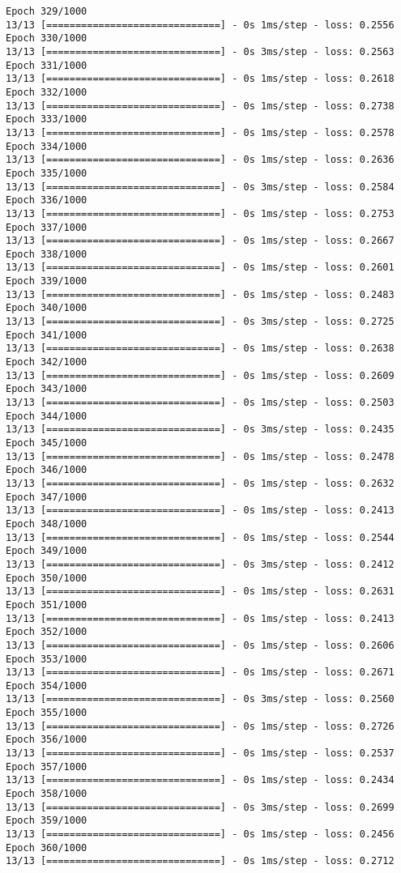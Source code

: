 \documentclass[11pt]{article}
\begin{document}
\begin{Verbatim}[commandchars=\\\{\}]
Epoch 329/1000
13/13 [==============================] - 0s 1ms/step - loss: 0.2556
Epoch 330/1000
13/13 [==============================] - 0s 3ms/step - loss: 0.2563
Epoch 331/1000
13/13 [==============================] - 0s 1ms/step - loss: 0.2618
Epoch 332/1000
13/13 [==============================] - 0s 1ms/step - loss: 0.2738
Epoch 333/1000
13/13 [==============================] - 0s 1ms/step - loss: 0.2578
Epoch 334/1000
13/13 [==============================] - 0s 1ms/step - loss: 0.2636
Epoch 335/1000
13/13 [==============================] - 0s 3ms/step - loss: 0.2584
Epoch 336/1000
13/13 [==============================] - 0s 1ms/step - loss: 0.2753
Epoch 337/1000
13/13 [==============================] - 0s 1ms/step - loss: 0.2667
Epoch 338/1000
13/13 [==============================] - 0s 1ms/step - loss: 0.2601
Epoch 339/1000
13/13 [==============================] - 0s 1ms/step - loss: 0.2483
Epoch 340/1000
13/13 [==============================] - 0s 3ms/step - loss: 0.2725
Epoch 341/1000
13/13 [==============================] - 0s 1ms/step - loss: 0.2638
Epoch 342/1000
13/13 [==============================] - 0s 1ms/step - loss: 0.2609
Epoch 343/1000
13/13 [==============================] - 0s 1ms/step - loss: 0.2503
Epoch 344/1000
13/13 [==============================] - 0s 3ms/step - loss: 0.2435
Epoch 345/1000
13/13 [==============================] - 0s 1ms/step - loss: 0.2478
Epoch 346/1000
13/13 [==============================] - 0s 1ms/step - loss: 0.2632
Epoch 347/1000
13/13 [==============================] - 0s 1ms/step - loss: 0.2413
Epoch 348/1000
13/13 [==============================] - 0s 1ms/step - loss: 0.2544
Epoch 349/1000
13/13 [==============================] - 0s 3ms/step - loss: 0.2412
Epoch 350/1000
13/13 [==============================] - 0s 1ms/step - loss: 0.2631
Epoch 351/1000
13/13 [==============================] - 0s 1ms/step - loss: 0.2413
Epoch 352/1000
13/13 [==============================] - 0s 1ms/step - loss: 0.2606
Epoch 353/1000
13/13 [==============================] - 0s 1ms/step - loss: 0.2671
Epoch 354/1000
13/13 [==============================] - 0s 3ms/step - loss: 0.2560
Epoch 355/1000
13/13 [==============================] - 0s 1ms/step - loss: 0.2726
Epoch 356/1000
13/13 [==============================] - 0s 1ms/step - loss: 0.2537
Epoch 357/1000
13/13 [==============================] - 0s 1ms/step - loss: 0.2434
Epoch 358/1000
13/13 [==============================] - 0s 3ms/step - loss: 0.2699
Epoch 359/1000
13/13 [==============================] - 0s 1ms/step - loss: 0.2456
Epoch 360/1000
13/13 [==============================] - 0s 1ms/step - loss: 0.2712

\end{Verbatim}
\end{document}
